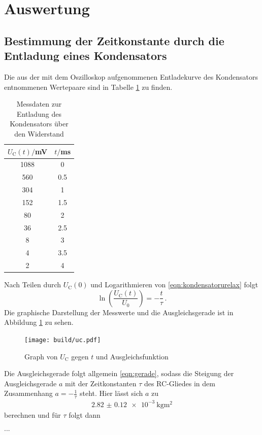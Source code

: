 \section{Auswertung}
\label{sec:Auswertung}
\subsection{Bestimmung der Zeitkonstante durch die Entladung eines Kondensators}
Die aus der mit dem Oszilloskop aufgenommenen Entladekurve des Kondensators
entnommenen Wertepaare sind in Tabelle \ref{tab:entladung} zu finden.

\begin{table}
\centering
\caption{Messdaten zur Entladung des Kondensators über den Widerstand}
\label{tab:entladung}
\begin{tabular}{c c}
\toprule
$U_\text{C}(t)/$mV & $t/$ms \\
\midrule
1088 &  0   \\
 560 &  0.5 \\
 304 &  1   \\
 152 &  1.5 \\
 80  &  2   \\
 36  &  2.5 \\
  8  &  3   \\
  4  &  3.5 \\
  2  &  4   \\
\bottomrule
\end{tabular}
\end{table}
Nach Teilen durch $U_\text{C}(0)$ und Logarithmieren von \eqref{eqn:kondensatorurelax} folgt
\begin{equation}
  \ln{\left(\frac{U_\mathrm{C}(t)}{U_0}\right)} = -\frac{t}{\tau}\,.
\end{equation}
Die graphische Darstellung der Messwerte und die Ausgleichsgerade ist in Abbildung \ref{fig:entladung}
zu sehen.
\begin{figure}
  \centering
  \texttt{[image: build/uc.pdf]}
  \caption{Graph von $U_\text{C}$ gegen $t$ und Ausgleichsfunktion}
  \label{fig:entladung}
\end{figure}
Die Ausgleichsgerade folgt allgemein \eqref{eqn:gerade}, sodass die Steigung der
Ausgleichsgerade $a$ mit der Zeitkonstanten $\tau$ des RC-Gliedes in dem Zusammenhang
$a = -\frac{1}{\tau}$ steht. Hier lässt sich $a$ zu
\begin{align}
  \SI{2.82(012)e-3}{\kilogram\meter\squared}
\end{align}
berechnen und für $\tau$ folgt dann
\begin{align}
\end{align}
...
